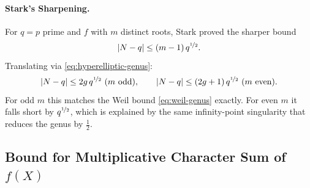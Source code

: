 \paragraph*{Stark's Sharpening.}
For $q=p$ prime and $f$ with $m$ distinct roots, Stark \cite{Stark_1973_RiemannHyperelliptic} proved the sharper bound
$$|N-q| \leq (m-1)\,q^{\nicefrac12}.$$
Translating via \eqref{eq:hyperelliptic-genus}:
\begin{equation}\label{eq:stark-genus}
  |N-q| \leq 2g\,q^{\nicefrac12}\ (m \text{ odd}),\qquad |N-q| \leq (2g+1)\,q^{\nicefrac12}\ (m \text{ even}).
\end{equation}
For odd $m$ this matches the Weil bound \eqref{eq:weil-genus} exactly. For even $m$ it falls short by $q^{\nicefrac12}$, which is explained by the same infinity-point singularity that reduces the genus by $\frac{1}{2}$.

\subsection{Bound for Multiplicative Character Sum of \texorpdfstring{$f(X)$}{f(X)}}


